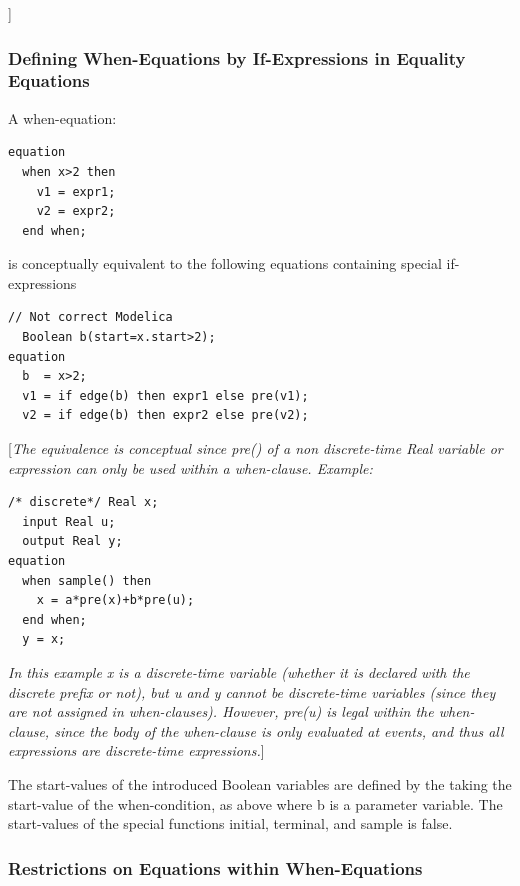 \documentclass[10pt,a4paper]{report}
\def\doublelabel#1{\label{#1}\hypertarget{#1}{}}
\begin{document}
{]}

\subsubsection{Defining When-Equations by If-Expressions in Equality Equations}\doublelabel{defining-when-equations-by-if-expressions-in-equality-equations}

A when-equation:
\begin{lstlisting}[language=modelica]
equation
  when x>2 then
    v1 = expr1;
	v2 = expr2;   
  end when; 
\end{lstlisting}

is conceptually equivalent to the following equations containing special
if-expressions

\begin{lstlisting}[language=modelica]
  // Not correct Modelica    
  Boolean b(start=x.start>2);   
equation
  b  = x>2;
  v1 = if edge(b) then expr1 else pre(v1);
  v2 = if edge(b) then expr2 else pre(v2); 
\end{lstlisting}

{[}\emph{The equivalence is conceptual since pre() of a non
discrete-time Real variable or expression can only be used within a
when-clause. Example:}

\begin{lstlisting}[language=modelica]
  /* discrete*/ Real x;   
  input Real u;   
  output Real y;
equation
  when sample() then
    x = a*pre(x)+b*pre(u);
  end when;
  y = x;
\end{lstlisting}

\emph{In this example x is a discrete-time variable (whether it is
declared with the discrete prefix or not), but u and y cannot be
discrete-time variables (since they are not assigned in when-clauses).
However, pre(u) is legal within the when-clause, since the body of the
when-clause is only evaluated at events, and thus all expressions are
discrete-time expressions.}{]}

The start-values of the introduced Boolean variables are defined by the
taking the start-value of the when-condition, as above where b is a
parameter variable. The start-values of the special functions initial,
terminal, and sample is false.

\subsubsection{Restrictions on Equations within When-Equations}\doublelabel{restrictions-on-equations-within-when-equations}
\end{document}
